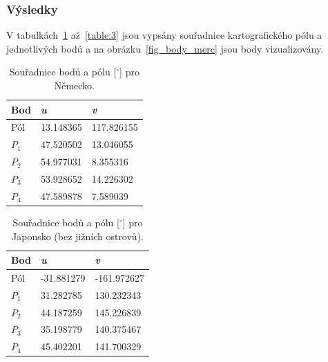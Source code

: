 \subsubsection*{Výsledky}
V tabulkách~\ref{table:1} až~\ref{table:3}  jsou vypsány souřadnice kartografického pólu a jednotlivých bodů a na obrázku~\ref{fig_body_merc} jsou body vizualizovány.
    \begin{table}[h!]
        \centering
        \begin{tabular}{|p{3cm}|p{3cm}|p{3cm}|} 
         \hline
            Bod & \textit{u}  & \textit{v} \\
            \hline
            Pól  &   13.148365  & 117.826155 \\
            \hline
            $P_1$   &  47.520502 &  13.046055\\
            \hline
            $P_2$   &  54.977031 & 8.355316 \\
            \hline
            $P_3$   &  53.928652 & 14.226302 \\
            \hline
            $P_4$   &  47.589878 & 7.589039 \\
            \hline
        \end{tabular}
        \caption{Souřadnice bodů a pólu [$^\circ$] pro Německo.}
\label{table:1}
    \end{table}
 

    \begin{table}[h!]
        \centering
        \begin{tabular}{|p{3cm}|p{3cm}|p{3cm}|} 
         \hline
            Bod & \textit{u}  & \textit{v} \\
            \hline
            Pól  &   -31.881279  & -161.972627 \\
            \hline
            $P_1$   &  31.282785 & 130.232343 \\
            \hline
            $P_2$   &  44.187259 & 145.226839\\
            \hline
            $P_3$   &  35.198779 & 140.375467 \\
            \hline
            $P_4$   &  45.402201 & 141.700329 \\
            \hline
        \end{tabular}
        \caption{Souřadnice bodů a pólu [$^\circ$] pro Japonsko (bez jižních ostrovů).}
\label{table:2}
    \end{table}

